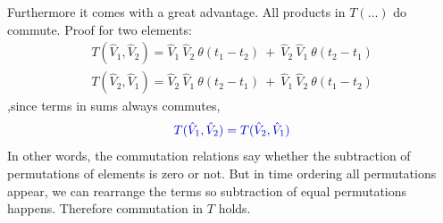 \documentclass[12pt, titlepage]{article}
\begin{document}
\begin{subappendices}
Furthermore it comes with a great advantage. All products in $ T(\ldots) $ do commute. Proof for two elements:
\begin{subequations}
\begin{align}
T(\hat{V}_1, \hat{V}_2)=\hat{V}_1\ \hat{V}_2\ \theta (t_1 -t_2)\ +\ \hat{V}_2\  \hat{V}_1 \ \theta (t_2-t_1)
\\
T(\hat{V}_2, \hat{V}_1)=\hat{V}_2\ \hat{V}_1\ \theta (t_2 -t_1)\ +\ \hat{V}_1\  \hat{V}_2 \ \theta (t_1-t_2)
\end{align}
\end{subequations}
,since terms in sums always commutes,
\begin{equation}\textcolor[RGB]{0,0,204}{
T(\hat{V}_1, \hat{V}_2)=T(\hat{V}_2, \hat{V}_1)
}
\end{equation}
In other words, the commutation relations say whether the subtraction of permutations of elements is zero or not. But in time ordering all permutations appear, we can rearrange the terms so subtraction of equal permutations happens. Therefore commutation in $ T $ holds.

\end{subappendices}
\end{document}
